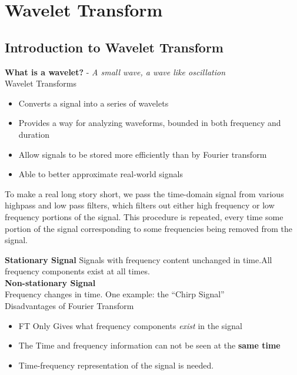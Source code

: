 \chapter{Wavelet Transform}

\section{Introduction to Wavelet Transform}

\textbf{What is a wavelet?} - \emph{A small wave, a wave like oscillation} \\

Wavelet Transforms \\ 
\vspace{-0.4in}
\begin{itemize}
\itemsep-1em
\item Converts a signal into a series of wavelets
\item Provides a way for analyzing waveforms, bounded in both frequency and duration
\item Allow signals to be stored more efficiently than by Fourier transform
\item Able to better approximate real-world signals
\end{itemize}

To make a real long story short, we pass the time-domain signal from various highpass and low pass filters, which filters out either high frequency or low frequency portions of the signal. This procedure is repeated, every time some portion of the signal corresponding to some frequencies being removed from the signal.


\textbf{Stationary Signal} 
Signals with frequency content unchanged in time.All frequency components exist at all times. \\
\textbf{Non-stationary Signal}\\
Frequency changes in time. One example: the “Chirp Signal” \\ 

Disadvantages of Fourier Transform \\ 
\vspace{-0.4in}
\begin{itemize}
\itemsep-1em
     \item FT Only Gives what frequency components \emph{exist} in the signal
    \item The Time and frequency information can not be seen at the \textbf{same time}
    \item Time-frequency representation of the signal is needed. 
\end{itemize}

